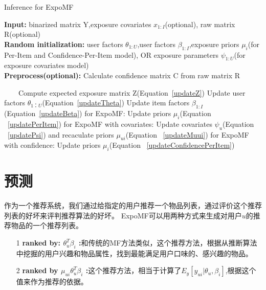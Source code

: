 \documentclass[notitlepage,cs4size,punct,oneside]{ctexrep}
\numberwithin{equation}{chapter}
\theoremstyle{mystyle}
\begin{document}
\begin{algorithm}[H]
\caption{Inference for ExpoMF} 
\hspace*{0.02in} {\bf Input:} 
binarized matrix Y,exposure covariates $x_{1:I}$(optional), raw matrix R(optional)\\
\hspace*{0.02in} {\bf Random initialization:} 
user factors $\theta_{1:U}$,user factors $\beta_{1:I}$,exposure priors $\mu_{i}$(for Per-Item and Confidence-Per-Item model),
OR exposure parameters $\psi_{1:U}$(for exposure covariates model)\\
\hspace*{0.02in} {\bf Preprocess(optional):}
Calculate confidence matrix C from raw matrix R 
\begin{algorithmic}[1]

　　\State Compute expected exposure matrix Z(Equation~\ref{updateZ})
	\State Update user factors $\theta_{1：U}$(Equation~\ref{updateTheta})
	\State Update item factors $\beta_{1:I}$(Equation~\ref{updateBeta})
	\State for ExpoMF: Update priors $\mu_i$(Equation ~\ref{updatePerItem})
	\State for ExpoMF with covariates: Update covariates $\psi_u$(Equation ~\ref{updatePsi}) and recaculate priors $\mu_{ui}$(Equation ~\ref{updateMuui})
	\State for ExpoMF with confidence: Update priors $\mu_i$(Equation ~\ref{updateConfidencePerItem})

\EndWhile

\end{algorithmic}
\end{algorithm}

\section{预测}
作为一个推荐系统，我们通过给指定的用户推荐一个物品列表，通过评价这个推荐列表的好坏来评判推荐算法的好坏。
ExpoMF可以用两种方式来生成对用户$u$的推荐物品的一个推荐列表。
\begin{itemize}

\item[1] \textbf{ranked by: $\theta_u^T\beta_i$ :}和传统的MF方法类似，这个推荐方法，根据从推断算法中挖掘的用户兴趣和物品属性，找到最能满足用户口味的、感兴趣的物品。


		

\item[2] \textbf{ranked by $\mu_{ui}\theta_u^T\beta_i$ :}这个推荐方法，相当于计算了$E_y[y_{ui}|\theta_u,\beta_i]$,根据这个值来作为推荐的依据。

\end{itemize}
\end{document}
